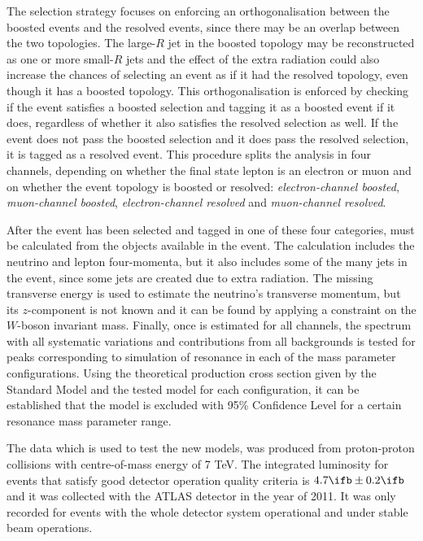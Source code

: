 The selection strategy focuses on enforcing an orthogonalisation between the boosted events and the resolved events, since there may be an overlap
between the two topologies. The large-$R$ jet in the boosted topology may be reconstructed as one or more small-$R$ jets and the effect of the extra radiation could also
increase the chances of selecting an event as if it had the resolved topology, even though it has a boosted topology.
This orthogonalisation is enforced by checking if the event satisfies
a boosted selection and tagging it as a boosted event if it does, regardless of whether it also satisfies the resolved selection as well. If the
event does not pass the boosted selection and it does pass the resolved selection, it is tagged as a resolved event. This procedure splits
the analysis in four channels, depending on whether the final state lepton is an electron or muon and on whether the event topology is boosted or resolved:
\emph{electron-channel boosted}, \emph{muon-channel boosted}, \emph{electron-channel resolved} and \emph{muon-channel resolved}.

After the event has been selected and tagged in one of these four categories, \mtt must be calculated from the objects available in the event.
The calculation includes the neutrino and lepton four-momenta, but it also includes some of the many jets in the event, since some jets are created due to
extra radiation. The missing transverse energy is used to estimate the neutrino's transverse momentum, but its $z$-component is not known and it can be found by applying
a constraint on the $W$-boson invariant mass.
Finally, once \mtt is estimated for all channels, the spectrum with all systematic variations and contributions from all backgrounds is tested for peaks corresponding
to simulation of resonance in each of the mass parameter configurations. Using the theoretical \ttbar production cross section
given by the Standard Model and the tested model for each configuration, it can be established that the model is excluded with 95\% Confidence Level for
a certain resonance mass parameter range. 

The data which is used to test the new models, was produced
from proton-proton collisions with centre-of-mass energy of 7 TeV.
The integrated luminosity for events that satisfy good detector
operation quality criteria is $4.7 \ifb \pm 0.2 \ifb$ 
and it was collected with the ATLAS detector in the year of 2011. It was only recorded for events with the whole detector system operational and under
stable beam operations.

